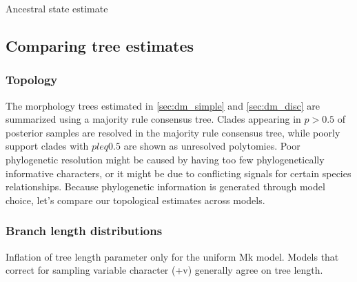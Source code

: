 Ancestral state estimate


\subsection{Comparing tree estimates}

\subsubsection{Topology}

The morphology trees estimated in \ref{sec:dm_simple} and \ref{sec:dm_disc} are summarized using a majority rule consensus tree.
Clades appearing in $p>0.5$ of posterior samples are resolved in the majority rule consensus tree, while poorly support clades with $p leq 0.5$ are shown as unresolved polytomies.
Poor phylogenetic resolution might be caused by having too few phylogenetically informative characters, or it might be due to conflicting signals for certain species relationships.
Because phylogenetic information is generated through model choice, let's compare our topological estimates across models.

\begin{figure}[h!]
\label{fig:simple_majrule}
\end{figure}

\begin{figure}[h!]
\label{fig:mk_simple_majrule}
\end{figure}

\begin{figure}[h!]
\label{fig:mk_discretized_majrule}
\end{figure}


\subsubsection{Branch length distributions}


Inflation of tree length parameter only for the uniform Mk model.
Models that correct for sampling variable character (+v) generally agree on tree length.

\newpage

